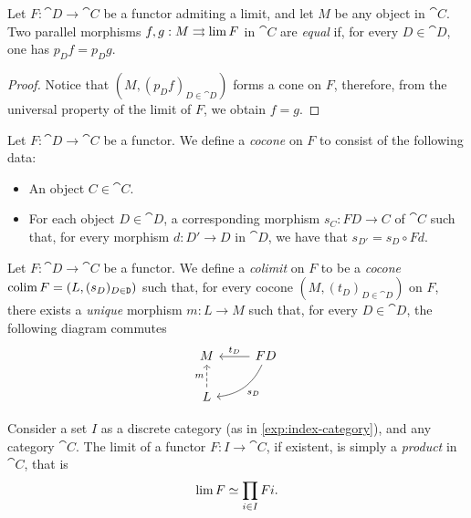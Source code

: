 \begin{proposition}
\label{prop:equal-parallel-factorizations}
Let \(F: \cat D \to \cat C\) be a functor admiting a limit, and let \(M\) be any
object in \(\cat C\). Two parallel morphisms \(f, g: M \rightrightarrows \operatorname{lim} F\) in
\(\cat C\) are \emph{equal} if, for every \(D \in \cat D\), one has
\(p_D f = p_D g\).
\end{proposition}

\begin{proof}
Notice that \((M, (p_D f)_{D \in \cat D})\) forms a cone on \(F\), therefore,
from the universal property of the limit of \(F\), we obtain \(f = g\).
\end{proof}

\begin{definition}[Cocone]
\label{def:cocone}
Let \(F: \cat D \to \cat C\) be a functor. We define a \emph{cocone} on \(F\) to
consist of the following data:
\begin{itemize}\setlength\itemsep{0em}
\item An object \(C \in \cat C\).

\item For each object \(D \in \cat D\), a corresponding morphism \(s_C: F D \to
  C\) of \(\cat C\) such that, for every morphism \(d: D' \to D\) in \(\cat D\),
  we have that \(s_{D'} = s_D \circ F d\).
\end{itemize}
\end{definition}

\begin{definition}[Colimit]
\label{def:colimit}
Let \(F: \cat D \to \cat C\) be a functor. We define a \emph{colimit} on \(F\)
to be a \emph{cocone} \(\operatorname{colim} F = (L, (s_D)_{D \in \texttt D})\) such that, for
every cocone \((M, (t_D)_{D \in \cat D})\) on \(F\), there exists a
\emph{unique} morphism \(m: L \to M\) such that, for every \(D \in \cat D\), the
following diagram commutes
\[
\begin{tikzcd}
M &F D \ar[l, "t_D"'] \ar[dl, bend left, "s_D"] \\
L \ar[u, dashed, "m"] &
\end{tikzcd}
\]
\end{definition}

\begin{example}[Products]
\label{exp:product-is-limit-over-indexing-set-diagram}
Consider a set \(I\) as a discrete category (as in \cref{exp:index-category}),
and any category \(\cat C\). The limit of a functor \(F: I \to \cat C\), if
existent, is simply a \emph{product} in \(\cat C\), that is
\[
\operatorname{lim} F \simeq \prod_{i \in I} F i.
\]
\end{example}

